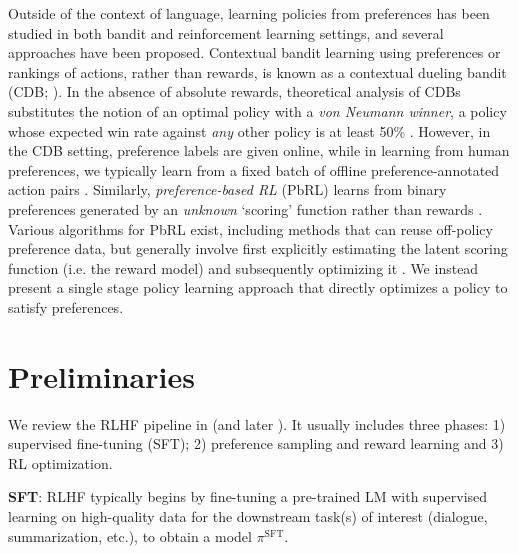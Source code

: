 \documentclass{article}
\newcommand{\pisft}{\pi^\text{SFT}} %
\begin{document}
Outside of the context of language, learning policies from preferences has been studied in both bandit and reinforcement learning settings, and several approaches have been proposed. Contextual bandit learning using preferences or rankings of actions, rather than rewards, is known as a contextual dueling bandit (CDB; \cite{yue2012karmed,dudik2015contextual}). In the absence of absolute rewards, theoretical analysis of CDBs substitutes the notion of an optimal policy with a \textit{von Neumann winner}, a policy whose expected win rate against \textit{any} other policy is at least 50\% \citep{dudik2015contextual}. However, in the CDB setting, preference labels are given online, while in learning from human preferences, we typically learn from a fixed batch of offline preference-annotated action pairs \citep{yan2022human}. Similarly, \textit{preference-based RL} (PbRL) learns from binary preferences generated by an \textit{unknown} `scoring' function rather than rewards \citep{BusaFekete2014,ruiz2023dueling}. Various algorithms for PbRL exist, including methods that can reuse off-policy preference data, but generally involve first explicitly estimating the latent scoring function (i.e. the reward model) and subsequently optimizing it \citep{jain2013learning,BusaFekete2014,christiano2017deep,sadigh2017active,kupcsik2018learning}. We instead present a single stage policy learning approach that directly optimizes a policy to satisfy preferences.



\section{Preliminaries}\label{section:prelims}

We review the RLHF pipeline in \citeauthor{ziegler2020finetuning} (and later \citep{stiennon2022learning, bai2022training, ouyang2022training}). It usually includes three phases: 1) supervised fine-tuning (SFT); 2) preference sampling and reward learning and 3) RL optimization.

\textbf{SFT}: RLHF typically begins by fine-tuning a pre-trained LM with supervised learning on high-quality data for the downstream task(s) of interest (dialogue, summarization, etc.), to obtain a model $\pisft$. 
\end{document}
